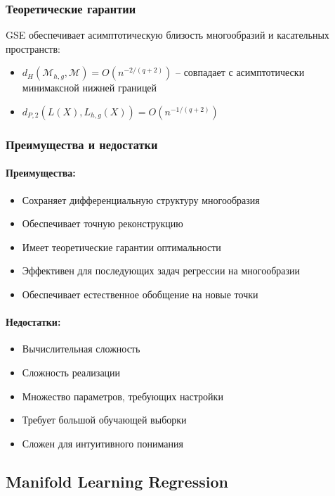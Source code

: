 \documentclass[a4paper,12pt]{article}
\begin{document}
\subsubsection{Теоретические гарантии}

GSE обеспечивает асимптотическую близость многообразий и касательных пространств:
\begin{itemize}
    \item $d_H(\mathcal{M}_{h,g}, \mathcal{M}) = O(n^{-2/(q+2)})$ -- совпадает с асимптотически минимаксной нижней границей
    \item $d_{P,2}(L(X), L_{h,g}(X)) = O(n^{-1/(q+2)})$
\end{itemize}

\subsubsection{Преимущества и недостатки}

\paragraph{Преимущества:}
\begin{itemize}
    \item Сохраняет дифференциальную структуру многообразия
    \item Обеспечивает точную реконструкцию
    \item Имеет теоретические гарантии оптимальности
    \item Эффективен для последующих задач регрессии на многообразии
    \item Обеспечивает естественное обобщение на новые точки
\end{itemize}

\paragraph{Недостатки:}
\begin{itemize}
    \item Вычислительная сложность
    \item Сложность реализации
    \item Множество параметров, требующих настройки
    \item Требует большой обучающей выборки
    \item Сложен для интуитивного понимания
\end{itemize}

\subsection{Manifold Learning Regression}
\end{document}
